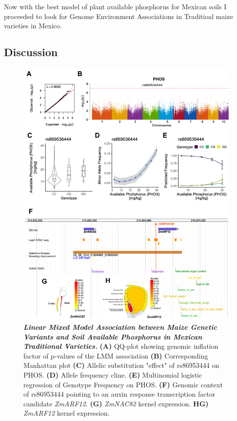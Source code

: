 Now with the best model of plant available phosphorus for Mexican soils  I  proceeded to look for Genome Environment Associations in Traditioal maize varieties in Mexico.

\subsection{Discussion}

\clearpage

\begin{figure} [t!]
\includegraphics[width=0.8\linewidth]{Chapter-2/figs/PHOS_mlm.png}
\caption[Linear Mixed Model Association between Maize Genetic Variants and Soil Available Phosphorus in Mexican Traditional Varieties]{\textit{\textbf{Linear Mixed Model Association between Maize Genetic Variants and Soil Available Phosphorus in Mexican Traditional Varieties.}}
\textbf{(A)}  QQ-plot showing genomic inflation factor of p-values of the LMM association
\textbf{(B)} Corresponding Manhattan plot 
\textbf{(C)} Allelic substitution "effect" of rs86953444 on PHOS.
\textbf{(D)} Allele frequency cline.
\textbf{(E)} Multinomial logistic regression of Genotype Frequency on PHOS.
\textbf{(F)} Genomic context of rs86953444 pointing to an auxin response transcription factor candidate \textit{ZmARF12}.
\textbf{(G)} \textit{ZmNAC82} kernel expression.
\textbf{HG)} \textit{ZmARF12} kernel expression.
}
\end{figure}
\clearpage


